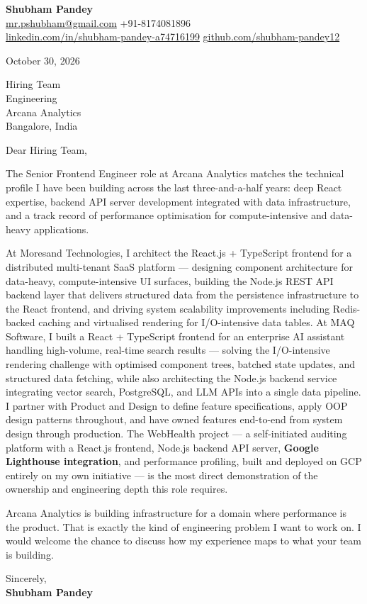 \documentclass[a4paper,11pt]{article}
\begin{document}
\textbf{\Large Shubham Pandey}\\
\href{mailto:mr.pshubham@gmail.com}{mr.pshubham@gmail.com} \quad +91-8174081896\\
\href{https://www.linkedin.com/in/shubham-pandey-a74716199/}{linkedin.com/in/shubham-pandey-a74716199} \quad
\href{https://github.com/shubham-pandey12}{github.com/shubham-pandey12}

\vspace{1em}
October 30, 2026

\vspace{1em}
Hiring Team\\
Engineering\\
Arcana Analytics\\
Bangalore, India

\vspace{1em}
Dear Hiring Team,

The Senior Frontend Engineer role at Arcana Analytics matches the technical profile I have been building across the last three-and-a-half years: deep React expertise, backend API server development integrated with data infrastructure, and a track record of performance optimisation for compute-intensive and data-heavy applications.

At Moresand Technologies, I architect the React.js + TypeScript frontend for a distributed multi-tenant SaaS platform --- designing component architecture for data-heavy, compute-intensive UI surfaces, building the Node.js REST API backend layer that delivers structured data from the persistence infrastructure to the React frontend, and driving system scalability improvements including Redis-backed caching and virtualised rendering for I/O-intensive data tables. At MAQ Software, I built a React + TypeScript frontend for an enterprise AI assistant handling high-volume, real-time search results --- solving the I/O-intensive rendering challenge with optimised component trees, batched state updates, and structured data fetching, while also architecting the Node.js backend service integrating vector search, PostgreSQL, and LLM APIs into a single data pipeline. I partner with Product and Design to define feature specifications, apply OOP design patterns throughout, and have owned features end-to-end from system design through production. The WebHealth project --- a self-initiated auditing platform with a React.js frontend, Node.js backend API server, \textbf{Google Lighthouse integration}, and performance profiling, built and deployed on GCP entirely on my own initiative --- is the most direct demonstration of the ownership and engineering depth this role requires.

Arcana Analytics is building infrastructure for a domain where performance is the product. That is exactly the kind of engineering problem I want to work on. I would welcome the chance to discuss how my experience maps to what your team is building.

\vspace{1em}
Sincerely,\\[0.5em]
\textbf{Shubham Pandey}
\end{document}
